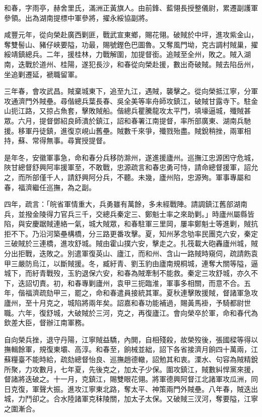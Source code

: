 \begin{pinyinscope}
和春，字雨亭，赫舍里氏，滿洲正黃旗人。由前鋒、藍翎長授整儀尉，累遷副護軍參領。出為湖南提標中軍參將，擢永綏協副將。

咸豐元年，從向榮赴廣西剿匪，戰武宣東鄉，賜花翎。破賊於中坪，進攻紫金山，奪雙髻山、豬仔峽要隘，功最，賜號鏗色巴圖魯。又奪風門坳，克古調村賊巢，擢綏靖鎮總兵。二年，援桂林，力戰解圍，加提督銜。追賊至全州，敗之。賊入湖南，迭戰於道州、桂陽，遂犯長沙，和春從向榮赴援，數出奇破賊。賊去陷岳州，坐追剿遷延，褫職留軍。

三年春，會攻武昌。賊棄城東下，追至九江，遇賊，襲擊之。從向榮抵江寧，分軍攻通濟門外賊壘。尋偕總兵葉長春、吳全美等率舟師攻鎮江，破賊甘露寺下。駐金山扼江路，又掠占魚套，擊敗賊船。偕總兵瞿騰龍攻太平門，填壕逼城，殲賊甚眾。六月，提督鄧紹良師潰於鎮江，詔和春署江南提督，率所部廣東、湖南兵馳援。移軍丹徒鎮，進復京峴山舊壘。賊數千來爭，殲戮殆盡。賊銳稍挫，兩軍相持，蘇、常得無事。尋實授提督。

是年冬，安徽軍事急，命和春分兵移防滁州，遂進援廬州。巡撫江忠源困守危城，陜甘總督舒興阿率援軍至，不敢戰，忠源疏言和春忠勇可恃，請命總督援軍，詔允之，而所部僅千人，請舒興阿分兵，不聽。未幾，廬州陷，忠源殉。軍事專屬和春，福濟繼任巡撫，為之副。

四年，疏言：「皖省軍情重大，兵勇雖有萬餘，多未經戰陣。請調鎮江舊部湖南兵，並撥金陵得力官兵三千，交總兵秦定三、鄭魁士率之來助剿。」時廬州屬縣皆陷，與安慶踞賊連絡一氣，城大賊眾，和春駐軍三里岡，屢率鄭魁士等進剿，賊抗拒不下。乃沿河築壘構橋，分三路更番攻擊。夏，知州茅念劬率民團克六安，秦定三破賊於三連橋，進攻舒城。賊由霍山撲六安，擊走之。扎筏載大砲轟廬州城，賊分出拒戰，迭敗之。別遣軍復英山、廬江，而和州、含山一路賊時窺伺，疏請飭袁甲三嚴防烏江，以斷賊援。冬，臧紆青、劉玉豹由廬南規桐城，連奪大關等隘，逼城下，而紆青戰歿，玉豹退保六安，和春為賊牽制不能救。秦定三攻舒城，亦久不下，迭詔切責。初，和春專剿廬州，袁甲三扼臨淮，軍事多相關，而意不合。五年，偕福濟疏劾甲三，罷之，命和春遣員接統其軍。夏秋連擊敗援賊，督諸軍急攻廬州，至十月克之，城陷將兩年矣。詔嘉和春功能補過，賜黃馬褂，予騎都尉世職。六年，復舒城，大破賊於三河，克之，再復廬江。會向榮卒於軍，命和春代為欽差大臣，督辦江南軍務。

自向榮兵挫，退守丹陽，江寧賊益驕，內閧，自相殘殺，故榮歿後，張國樑等得以撫輯餘軍，規復東壩、高淳。和春至，餉械並絀，詔下各省接濟月餉四十萬兩，江蘇糧臺不能時給，疏劾總督怡良、巡撫趙德轍，詔勉其和衷。溧水、句容為賊精銳所聚，力攻數月，七年夏，先後克之，加太子少保。圍攻鎮江，賊數糾悍黨來援，督諸將迭破之。十一月，克鎮江，賜雙眼花翎。將軍德興阿督江北諸軍攻瓜洲，同日克復，軍聲大振。進攻江寧東北路，奪太平、神策兩門外賊壘。八年春，賊迭出城，力鬥卻之。合水陸諸軍克秣陵關，加太子太保。又破賊三汊河，奪要隘，江寧之圍漸合。


\end{pinyinscope}
